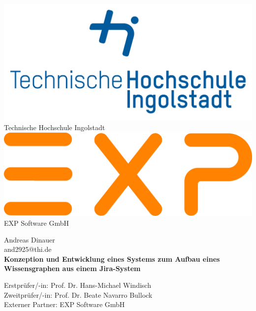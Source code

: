 \documentclass[10pt]{article}
\begin{document}
\renewcommand\thesection{\Roman{section}}
\begin{titlepage}
    \begin{center}
        \begin{multicols}{2}
            \includegraphics[scale=.3]{dateien/THI_Logo.jpg} \\
            \vspace{0.5cm}
            Technische Hochschule Ingolstadt\\
            \columnbreak
            \includegraphics[scale=.2]{dateien/EXP Logo.png} \\
            \vspace{1.5cm}
            EXP Software GmbH\\
        \end{multicols}
        \vspace{1cm}
        \normalsize
        Andreas Dinauer\\
        and2925@thi.de\\
        
        \vspace*{0.5cm}
        \LARGE
        \textbf{Konzeption und Entwicklung eines Systems zum Aufbau eines Wissensgraphen aus einem Jira-System}
            
        \vspace{1cm}
        \normalsize
        Erstprüfer/-in: Prof. Dr. Hans-Michael Windisch \\
        Zweitprüfer/-in: Prof. Dr. Beate Navarro Bullock \\
        \vspace{1cm}
        \normalsize
        Externer Partner: EXP Software GmbH
            
    \end{center}
\end{titlepage}
\end{document}
